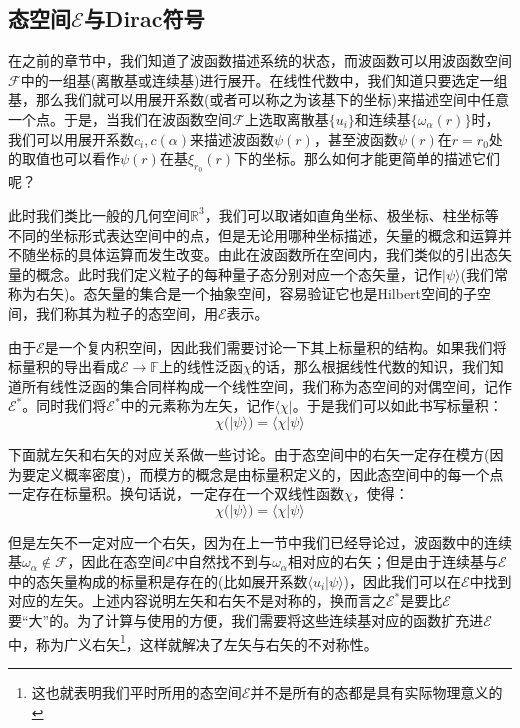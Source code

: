  \subsection{态空间$\mathscr{E}$与Dirac符号}\label{subsection:Diracnotation}
 在之前的章节中，我们知道了波函数描述系统的状态，而波函数可以用波函数空间$\mathscr{F}$中的一组基(离散基或连续基)进行展开。在线性代数中，我们知道只要选定一组基，那么我们就可以用展开系数(或者可以称之为该基下的坐标)来描述空间中任意一个点。于是，当我们在波函数空间$\mathscr{F}$上选取离散基$\{u_i\}$和连续基$\{\omega_\alpha(r)\}$时，我们可以用展开系数$c_i,c(\alpha)$来描述波函数$\psi(r)$，甚至波函数$\psi(r)$在$r=r_0$处的取值也可以看作$\psi(r)$在基$\xi_{r_0}(r)$下的坐标。那么如何才能更简单的描述它们呢？
 
 此时我们类比一般的几何空间$\mathbb{R}^3$，我们可以取诸如直角坐标、极坐标、柱坐标等不同的坐标形式表达空间中的点，但是无论用哪种坐标描述，矢量的概念和运算并不随坐标的具体运算而发生改变。由此在波函数所在空间内，我们类似的引出态矢量的概念。此时我们定义粒子的每种量子态分别对应一个态矢量，记作$|\psi\rangle$(我们常称为右矢)。态矢量的集合是一个抽象空间，容易验证它也是Hilbert空间的子空间，我们称其为粒子的态空间，用$\mathscr{E}$表示。
 
 由于$\mathscr{E}$是一个复内积空间，因此我们需要讨论一下其上标量积的结构。如果我们将标量积的导出看成$\mathscr{E}\rightarrow\mathbb{F}$上的线性泛函$\chi$的话，那么根据线性代数的知识，我们知道所有线性泛函的集合同样构成一个线性空间，我们称为态空间的对偶空间，记作$\mathscr{E}^*$。同时我们将$\mathscr{E}^*$中的元素称为左矢，记作$\langle\chi|$。于是我们可以如此书写标量积：
 \begin{equation}
     \chi(|\psi\rangle)=\langle\chi|\psi\rangle
 \end{equation}
 
 下面就左矢和右矢的对应关系做一些讨论。由于态空间中的右矢一定存在模方(因为要定义概率密度)，而模方的概念是由标量积定义的，因此态空间中的每一个点一定存在标量积。换句话说，一定存在一个双线性函数$\chi$，使得：
 \begin{equation}
     \chi(|\psi\rangle)=\langle\chi|\psi\rangle
 \end{equation}
 
 但是左矢不一定对应一个右矢，因为在上一节中我们已经导论过，波函数中的连续基$\omega_\alpha\notin\mathscr{F}$，因此在态空间$\mathscr{E}$中自然找不到与$\omega_\alpha$相对应的右矢；但是由于连续基与$\mathscr{E}$中的态矢量构成的标量积是存在的(比如展开系数$\langle u_i|\psi\rangle$)，因此我们可以在$\mathscr{E}$中找到对应的左矢。上述内容说明左矢和右矢不是对称的，换而言之$\mathscr{E}^*$是要比$\mathscr{E}$要“大”的。为了计算与使用的方便，我们需要将这些连续基对应的函数扩充进$\mathscr{E}$中，称为广义右矢\footnote{这也就表明我们平时所用的态空间$\mathscr{E}$并不是所有的态都是具有实际物理意义的}，这样就解决了左矢与右矢的不对称性。
 
